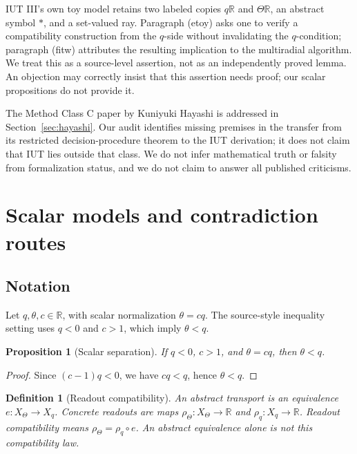\documentclass[11pt]{article}
\newtheorem{proposition}[theorem]{Proposition}
\newtheorem{definition}[theorem]{Definition}
\begin{document}
IUT III's own toy model retains two labeled copies $q\mathbb R$ and $\Theta\mathbb R$, an abstract symbol $*$, and a set-valued ray. Paragraph (etoy) asks one to verify a compatibility construction from the $q$-side without invalidating the $q$-condition; paragraph (fitw) attributes the resulting implication to the multiradial algorithm. We treat this as a source-level assertion, not as an independently proved lemma. An objection may correctly insist that this assertion needs proof; our scalar propositions do not provide it.

The Method Class C paper by Kuniyuki Hayashi is addressed in Section~\ref{sec:hayashi}. Our audit identifies missing premises in the transfer from its restricted decision-procedure theorem to the IUT derivation; it does not claim that IUT lies outside that class. We do not infer mathematical truth or falsity from formalization status, and we do not claim to answer all published criticisms.

\section{Scalar models and contradiction routes}
\subsection{Notation}
Let $q,\theta,c\in\mathbb R$, with scalar normalization $\theta=cq$. The source-style inequality setting uses $q<0$ and $c>1$, which imply $\theta<q$.
\begin{proposition}[Scalar separation]\label{prop:separation}
If $q<0$, $c>1$, and $\theta=cq$, then $\theta<q$.
\end{proposition}
\begin{proof}
Since $(c-1)q<0$, we have $cq<q$, hence $\theta<q$.
\end{proof}
\begin{definition}[Readout compatibility]
An abstract transport is an equivalence $e:X_\Theta\to X_q$. Concrete readouts are maps $\rho_\Theta:X_\Theta\to\mathbb R$ and $\rho_q:X_q\to\mathbb R$. Readout compatibility means $\rho_\Theta=\rho_q\circ e$. An abstract equivalence alone is not this compatibility law.
\end{definition}
\end{document}
